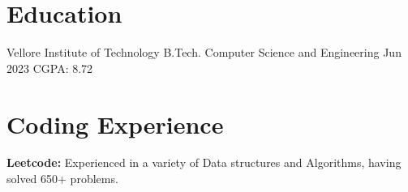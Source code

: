 \documentclass[letterpaper]{resume_config}
\begin{document}
\section{Education}

\EducationExperience
    {Vellore Institute of Technology} %
    {B.Tech. Computer Science and Engineering} %
    {Jun 2023} %
    {CGPA: 8.72} %

\vspace{-7pt}



\section{Coding Experience}
\begin{SkillsList}
    \item \textbf{Leetcode:} Experienced in a variety of Data structures and Algorithms, having solved 650+ problems. \\
\end{SkillsList}
\end{document}
